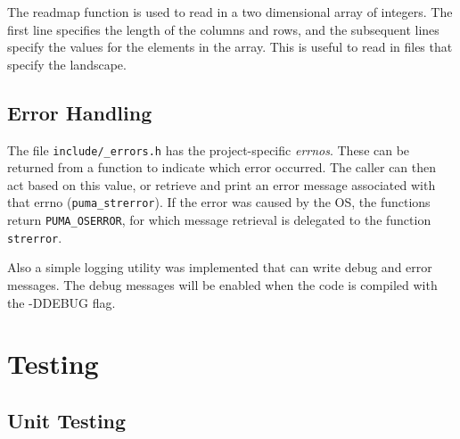 \documentclass[12pt,a4paper]{article}
\begin{document}
The readmap function is used to read in a two dimensional array of integers. The first line specifies the length of the columns and rows, and the subsequent lines specify the values for the elements in the array. This is useful to read in files that specify the landscape.

\subsection{Error Handling}

The file \texttt{include/\_errors.h} has the project-specific \emph{errnos}. These can be returned from a function to indicate which error occurred. The caller can then act based on this value, or retrieve and print an error message associated with that errno (\texttt{puma\_strerror}). If the error was caused by the OS, the functions return \texttt{PUMA\_OSERROR}, for which message retrieval is delegated to the function \texttt{strerror}.

Also a simple logging utility was implemented that can write debug and error messages. The debug messages will be enabled when the code is compiled with the -DDEBUG flag.






\section{Testing}

\subsection{Unit Testing}
\end{document}
